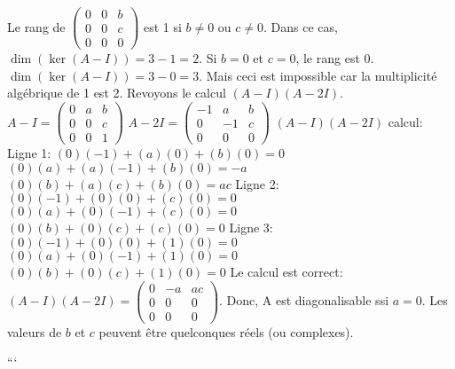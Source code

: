 \begin{solution}
\begin{enumerate}
    Le rang de $\begin{pmatrix} 0 & 0 & b \\ 0 & 0 & c \\ 0 & 0 & 0 \end{pmatrix}$ est 1 si $b \ne 0$ ou $c \ne 0$. Dans ce cas, $\dim(\ker(A-I)) = 3 - 1 = 2$.
    Si $b=0$ et $c=0$, le rang est 0. $\dim(\ker(A-I)) = 3 - 0 = 3$. Mais ceci est impossible car la multiplicité algébrique de 1 est 2.
    Revoyons le calcul $(A-I)(A-2I)$.
    $A-I = \begin{pmatrix} 0 & a & b \\ 0 & 0 & c \\ 0 & 0 & 1 \end{pmatrix}$
    $A-2I = \begin{pmatrix} -1 & a & b \\ 0 & -1 & c \\ 0 & 0 & 0 \end{pmatrix}$
    $(A-I)(A-2I)$ calcul:
    Ligne 1: $(0)(-1) + (a)(0) + (b)(0) = 0$
    $(0)(a) + (a)(-1) + (b)(0) = -a$
    $(0)(b) + (a)(c) + (b)(0) = ac$
    Ligne 2: $(0)(-1) + (0)(0) + (c)(0) = 0$
    $(0)(a) + (0)(-1) + (c)(0) = 0$
    $(0)(b) + (0)(c) + (c)(0) = 0$
    Ligne 3: $(0)(-1) + (0)(0) + (1)(0) = 0$
    $(0)(a) + (0)(-1) + (1)(0) = 0$
    $(0)(b) + (0)(c) + (1)(0) = 0$
    Le calcul est correct: $(A-I)(A-2I) = \begin{pmatrix} 0 & -a & ac \\ 0 & 0 & 0 \\ 0 & 0 & 0 \end{pmatrix}$.
    Donc, A est diagonalisable ssi $a=0$. Les valeurs de $b$ et $c$ peuvent être quelconques réels (ou complexes).
\end{enumerate}
\end{solution}


```